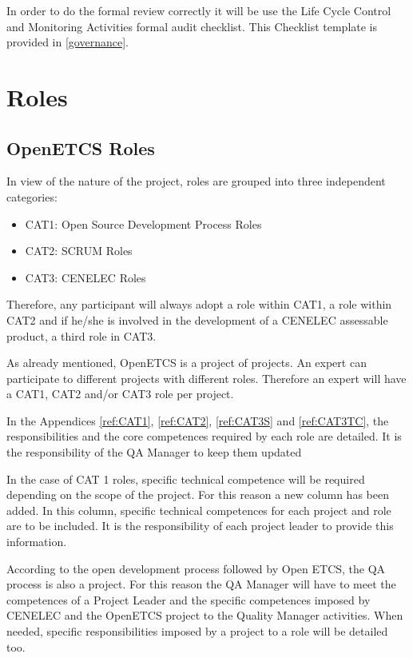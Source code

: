 \documentclass{template/openetcs_article}
\begin{document}
In order to do the formal review correctly it will be use the Life Cycle Control and Monitoring Activities formal audit checklist. This Checklist template is provided in \href{https://github.com/openETCS/governance/tree/master/Templates}{[governance]}.


\section{Roles}

\newcommand\todoin[2][]{\todo[inline, caption={2do}, #1]{
\begin{minipage}{\textwidth-4pt}#2\end{minipage}}}

\subsection{OpenETCS Roles}

In view of the nature of the project, roles are grouped into three independent categories:

\begin{itemize}
\item CAT1: Open Source Development Process Roles
\item CAT2: SCRUM Roles
\item CAT3: CENELEC Roles 
\end{itemize}

Therefore, any participant will always adopt a role within CAT1, a role within CAT2 and if he/she is involved in the development of a CENELEC assessable product, a third role in CAT3.

As already mentioned, OpenETCS is a project of projects. An expert can participate to different projects with different roles. Therefore an expert will have a CAT1, CAT2 and/or CAT3 role per project.

In the Appendices \ref{ref:CAT1}, \ref{ref:CAT2}, \ref{ref:CAT3S} and \ref{ref:CAT3TC}, the responsibilities and the core competences required by each role are detailed. It is the responsibility of the QA Manager to keep them updated

In the case of CAT 1 roles, specific technical competence will be required depending on the scope of the project. For this reason a new column has been added. In this column, specific technical competences for each project and role are to be included. It is the responsibility of each project leader to provide this information.

According to the open development process followed by Open \gls{ETCS}, the QA process is also a project. For this reason the QA Manager will have to meet the competences of a Project Leader and the specific competences imposed by CENELEC and the OpenETCS project to the Quality Manager activities. When needed, specific responsibilities imposed by a project to a role will be detailed too.
\end{document}
